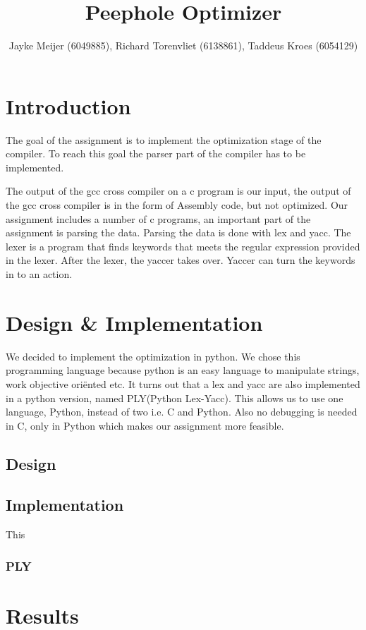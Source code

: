 \documentclass[10pt,a4paper]{article}
\title{Peephole Optimizer}
\author{Jayke Meijer (6049885), Richard Torenvliet (6138861), Taddeus Kroes (6054129)}
\begin{document}
\maketitle

\section{Introduction}
The goal of the assignment is to implement the optimization stage of the compiler. To reach this goal the parser part of the compiler has to be implemented.

The output of the gcc cross compiler on a c program is our input, the output of the gcc cross compiler is in the form of Assembly code, but not optimized. Our assignment includes a number of c programs, an important part of the assignment is parsing the data. Parsing the data is done with lex and yacc. The lexer is a program that finds keywords that meets the regular expression provided in the lexer. After the lexer, the yaccer takes over. Yaccer can turn the keywords in to an action.

\section{Design \& Implementation}
We decided to implement the optimization in python. We chose this programming language because python is an easy language to manipulate strings, work objective ori\"ented etc.
It turns out that a lex and yacc are also implemented in a python version, named PLY(Python Lex-Yacc). This allows us to use one language, Python, instead of two i.e. C and Python. Also no debugging is needed in C, only in Python which makes our assignment more feasible.

\subsection{Design}


\subsection*{Implementation}
This 

\subsubsection*{PLY}

\section{Results}
\end{document}
